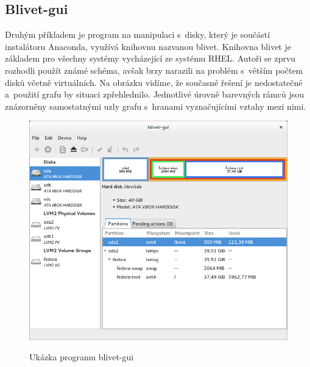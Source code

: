 \documentclass[a4paper,twosided]{article}
\begin{document}
\subsection{Blivet-gui}

Druhým příkladem je program na manipulaci s~disky, který je součástí instalátoru Anaconda, využívá knihovnu nazvanou blivet. Knihovna blivet je základem pro všechny systémy vycházející ze systému RHEL. Autoři 
se zprvu rozhodli použít známé schéma, avšak brzy narazili na problém s~větším počtem disků včetně virtuálních. Na obrázku vidíme, že současné řešení je nedostatečné a~použití grafu by
situaci zpřehlednilo. Jednotlivé úrovně barevných rámců jsou znázorněny samostatnými uzly grafu s~hranami vyznačujícími vztahy mezi nimi. 
\printbibliography

\begin{figure}[hb]
\label{fig:blivet}
\caption{Ukázka programu blivet-gui~\cite{blivet-gui}}
\centering
\includegraphics[width=.8\columnwidth]{pics/blivet-gui-1.png}\\
\end{figure}
\end{document}
